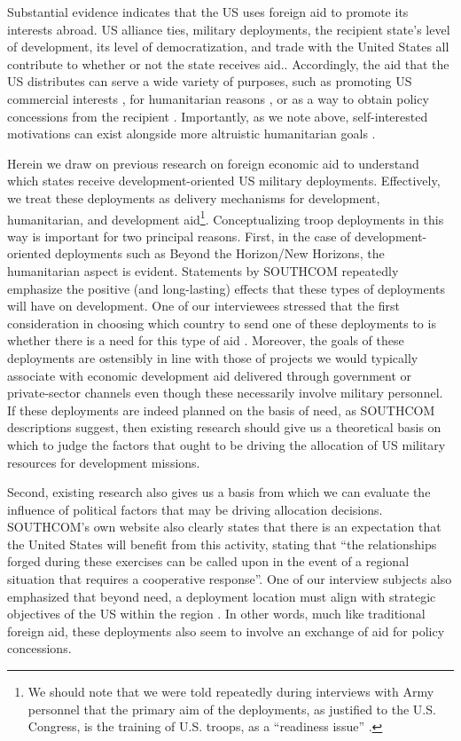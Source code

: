 \documentclass[12pt]{article}
\begin{document}
\begin{doublespace}
Substantial evidence indicates that the US uses foreign aid to promote its interests abroad. US alliance ties, military deployments, the recipient state's level of development, its level of democratization, and trade with the United States all contribute to whether or not the state receives aid.\cite{MKP1998,AlesinaDollar2000,bdm07,FleckKilby2006,FleckKilby2010,MilnerTingley2011}. Accordingly, the aid that the US distributes can serve a wide variety of purposes, such as promoting US commercial interests \cite{FleckKilby2006,MilnerTingley2010}, for humanitarian reasons \cite{drury2005politics}, or as a way to obtain policy concessions from the recipient \cite{BDMetal2003}. Importantly, as we note above, self-interested motivations can exist alongside more altruistic humanitarian goals .  

Herein we draw on previous research on foreign economic aid to understand which states receive development-oriented US military deployments. Effectively, we treat these deployments as delivery mechanisms for development, humanitarian, and development aid\footnote{We should note that we were told repeatedly during interviews with Army personnel that the primary aim of the deployments, as justified to the U.S. Congress, is the training of U.S. troops, as a ``readiness issue'' \cite{CPT20160309}.}. Conceptualizing troop deployments in this way is important for two principal reasons. First, in the case of development-oriented deployments such as Beyond the Horizon/New Horizons, the humanitarian aspect is evident.  Statements by SOUTHCOM repeatedly emphasize the positive (and long-lasting) effects that these types of deployments will have on development.  One of our interviewees stressed that the first consideration in choosing which country to send one of these deployments to is whether there is a need for this type of aid \cite{CPT20160309}. Moreover, the goals of these deployments are ostensibly in line with those of projects we would typically associate with economic development aid delivered through government or private-sector channels even though these necessarily involve military personnel. If these deployments are indeed planned on the basis of need, as SOUTHCOM descriptions suggest, then existing research should give us a theoretical basis on which to judge the factors that ought to be driving the allocation of US military resources for development missions. 

Second, existing research also gives us a basis from which we can evaluate the influence of political factors that may be driving allocation decisions. SOUTHCOM's own website also clearly states that there is an expectation that the United States will benefit from this activity, stating that ``the relationships forged during these exercises can be called upon in the event of a regional situation that requires a cooperative response''\cite{southcom2015}.  One of our interview subjects also emphasized that beyond need, a deployment location must align with strategic objectives of the US within the region \cite{CPT20160309}.  In other words, much like traditional foreign aid, these deployments also seem to involve an exchange of aid for policy concessions.


\end{doublespace}
\end{document}

